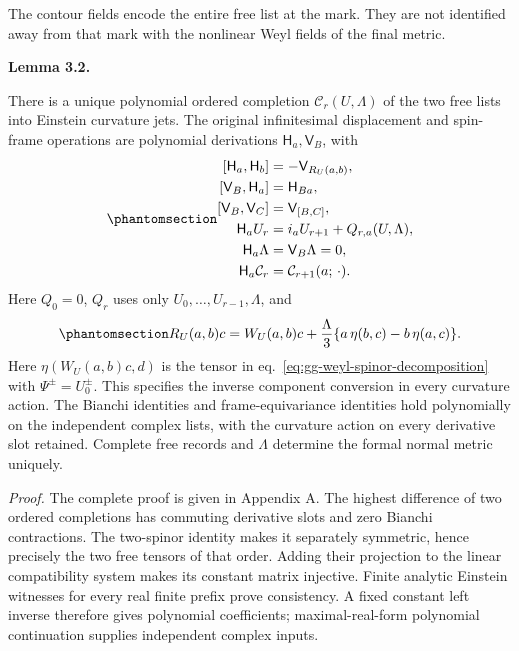 \documentclass[
  english,
  11pt,
  reqno]{amsart}
\makeatletter
\newcommand{\pandocstatementheading}[1]{%
  \par\addpenalty{\@beginparpenalty}%
  \addvspace{.5\baselineskip plus .2\baselineskip minus .2\baselineskip}%
  {\normalfont\bfseries #1\par}%
  \nobreak\@afterindenttrue\@afterheading
}
\makeatother
\begin{document}
The contour fields encode the entire free list at the mark. They are not
identified away from that mark with the nonlinear Weyl fields of the
final metric.

\pandocstatementheading{\protect{}\label{lem:gg-completion}Lemma 3.2.}

There is a unique polynomial ordered completion
\(\mathcal C_r(U,\Lambda)\) of the two free lists into Einstein
curvature jets. The original infinitesimal displacement and spin-frame
operations are polynomial derivations \(\mathsf H_a,\mathsf V_B\), with
\begin{equation}\protect\phantomsection\label{eq:gg-cartan-derivations}{\begin{aligned}
[\mathsf H_a,\mathsf H_b]&=-\mathsf V_{R_U(a,b)}, \\
[\mathsf V_B,\mathsf H_a]&=\mathsf H_{Ba}, \\
[\mathsf V_B,\mathsf V_C]&=\mathsf V_{[B,C]}, \\
\mathsf H_aU_r&=i_aU_{r+1}+Q_{r,a}(U,\Lambda), \\
\mathsf H_a\Lambda&=\mathsf V_B\Lambda=0, \\
\mathsf H_a\mathcal C_r&=\mathcal C_{r+1}(a;\,\cdot).
\end{aligned}}\end{equation} Here \(Q_0=0\), \(Q_r\) uses only
\(U_0,\ldots,U_{r-1},\Lambda\), and
\begin{equation}\protect\phantomsection\label{eq:gg-algebraic-curvature}{
 R_U(a,b)c=W_U(a,b)c+
       \frac{\Lambda}{3}\{a\,\eta(b,c)-b\,\eta(a,c)\}.
}\end{equation} Here \(\eta(W_U(a,b)c,d)\) is the tensor in
eq.~\ref{eq:gg-weyl-spinor-decomposition} with \(\Psi^\pm=U_0^\pm\).
This specifies the inverse component conversion in every curvature
action. The Bianchi identities and frame-equivariance identities hold
polynomially on the independent complex lists, with the curvature action
on every derivative slot retained. Complete free records and \(\Lambda\)
determine the formal normal metric uniquely.

\emph{Proof.} The complete proof is given in Appendix A. The highest
difference of two ordered completions has commuting derivative slots and
zero Bianchi contractions. The two-spinor identity makes it separately
symmetric, hence precisely the two free tensors of that order. Adding
their projection to the linear compatibility system makes its constant
matrix injective. Finite analytic Einstein witnesses for every real
finite prefix prove consistency. A fixed constant left inverse therefore
gives polynomial coefficients; maximal-real-form polynomial continuation
supplies independent complex inputs.
\end{document}
